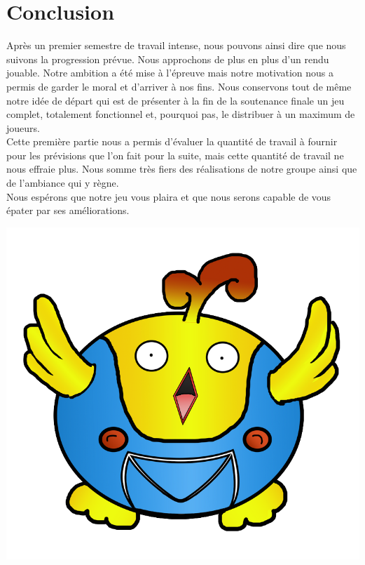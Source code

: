\documentclass [11pt]{report}
\begin{document}
\chapter*{Conclusion}

Après un premier semestre de travail intense, nous pouvons ainsi dire que nous suivons la progression prévue. Nous approchons de plus en plus d'un rendu jouable. Notre ambition a été mise à l'épreuve mais notre motivation nous a permis de garder le moral et d'arriver à nos fins. Nous conservons tout de même notre idée de départ qui est de présenter à la fin de la soutenance finale un jeu complet, totalement fonctionnel et, pourquoi pas, le distribuer à un maximum de joueurs.\\

Cette première partie nous a permis d'évaluer la quantité de travail à fournir pour les prévisions que l'on fait pour la suite, mais cette quantité de travail ne nous effraie plus. Nous somme très fiers des réalisations de notre groupe ainsi que de l'ambiance qui y règne.\\

Nous espérons que notre jeu vous plaira et que nous serons capable de vous épater par ses améliorations.\\


\vspace{10mm}
		
		\begin{center}
		\includegraphics[scale=1.3]{images/birdfin.png}
		\end{center}
\end{document}
